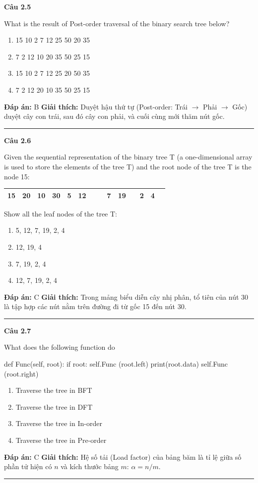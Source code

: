 \documentclass[11pt,a4paper]{article}
\newenvironment{question}[1]{%
  \par\vspace{1em}\noindent\textbf{\large Câu #1}\par\vspace{0.4em}
}{%
  \par\vspace{1em}\hrule\vspace{0.6em}
}
\newenvironment{choices}{%
  \begin{enumerate}[label=\textbf{\Alph*.},leftmargin=2.2em,itemsep=2pt,topsep=3pt]
}{%
  \end{enumerate}
}
\newcommand{\choice}{\item}
\newenvironment{codebox}{%
  \begin{tcolorbox}[colback=gray!8!white,colframe=gray!50!black,arc=1.5mm,boxrule=0.6pt,left=3mm,right=3mm,top=2.5mm,bottom=2.5mm]
  \ttfamily\small
}{%
  \end{tcolorbox}
}
\begin{document}
\begin{question}{2.5}
What is the result of Post-order traversal of the binary search tree below?
\begin{center}
\end{center}
\begin{choices}
\choice 15 10 2 7 12 25 50 20 35
\choice 7 2 12 10 20 35 50 25 15
\choice 15 10 2 7 12 25 20 50 35
\choice 7 2 12 20 10 35 50 25 15
\end{choices}
\textbf{Đáp án:} B
\textbf{Giải thích:} Duyệt hậu thứ tự (Post-order: Trái $\to$ Phải $\to$ Gốc) duyệt cây con trái, sau đó cây con phải, và cuối cùng mới thăm nút gốc.
\end{question}

\begin{question}{2.6}
Given the sequential representation of the binary tree T (a one-dimensional array is used to store the elements of the tree T) and the root node of the tree T is the node 15:
\begin{center}
\begin{tabular}{|*{14}{c|}}
\hline
15 & 20 & 10 & 30 & 5 & 12 & & & 7 & 19 & & 2 & 4 & \\
\hline
\end{tabular}
\end{center}
Show all the leaf nodes of the tree T:
\begin{choices}
\choice 5, 12, 7, 19, 2, 4
\choice 12, 19, 4
\choice 7, 19, 2, 4
\choice 12, 7, 19, 2, 4
\end{choices}
\textbf{Đáp án:} C
\textbf{Giải thích:} Trong mảng biểu diễn cây nhị phân, tổ tiên của nút 30 là tập hợp các nút nằm trên đường đi từ gốc 15 đến nút 30.
\end{question}

\begin{question}{2.7}
What does the following function do
\begin{codebox}
def Func(self, root):
    if root:
        self.Func (root.left)
        print(root.data)
        self.Func (root.right)
\end{codebox}
\begin{choices}
\choice Traverse the tree in BFT
\choice Traverse the tree in DFT
\choice Traverse the tree in In-order
\choice Traverse the tree in Pre-order
\end{choices}
\textbf{Đáp án:} C
\textbf{Giải thích:} Hệ số tải (Load factor) của bảng băm là tỉ lệ giữa số phần tử hiện có $n$ và kích thước bảng $m$: $\alpha = n/m$.
\end{question}
\end{document}
